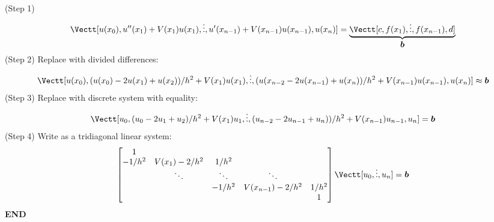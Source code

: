 \documentclass[12pt,a4paper]{article}
\def\b{ {\vc b} }
\begin{document}
(Step 1) 
\[
\Vectt[u(x_0), u''(x_1) + V(x_1) u(x_1), \ensuremath{\vdots}, u'(x_{n-1}) + V(x_{n-1}) u(x_{n-1}), u(x_n)] = \underbrace{\Vectt[c, f(x_1),\ensuremath{\vdots},f(x_{n-1}), d]}_{\ensuremath{\bm{\b}}}
\]
(Step 2) Replace with divided differences:
\[
\Vectt[u(x_0), (u(x_0)-2u(x_1)+u(x_2))/h^2 + V(x_1)u(x_1), \ensuremath{\vdots}, (u(x_{n-2} - 2u(x_{n-1})+u(x_n))/h^2 + V(x_{n-1})u(x_{n-1}), u(x_n)] \ensuremath{\approx} \ensuremath{\bm{\b}}
\]
(Step 3) Replace with discrete system with equality:
\[
\Vectt[u_0, (u_0-2u_1+u_2)/h^2 + V(x_1)u_1, \ensuremath{\vdots}, (u_{n-2}-2u_{n-1}+u_n))/h^2+ V(x_{n-1})u_{n-1},u_n] = \ensuremath{\bm{\b}}
\]
(Step 4) Write as a tridiagonal linear system:
\[
\begin{bmatrix}
1 \\
-1/h^2 & V(x_1)-2/h^2 & 1/h^2 \\
& \ensuremath{\ddots} & \ensuremath{\ddots} & \ensuremath{\ddots} \\
&&-1/h^2 & V(x_{n-1})-2/h^2 & 1/h^2 \\
&& &&1
\end{bmatrix} \Vectt[u_0,\ensuremath{\vdots},u_n] = \ensuremath{\bm{\b}}
\]
\textbf{END}
\end{document}
